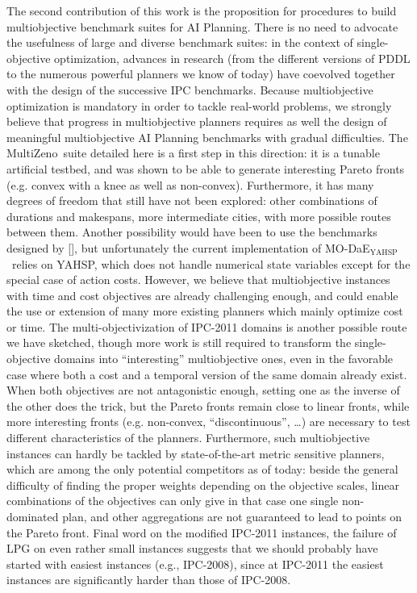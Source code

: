 \documentclass[letterpaper]{article}
\newcommand{\MODAEYAHSP}{{\sc MO-DaE$_{\text{YAHSP}}$}}
\def\MULTIZENO{{\sc MultiZeno}}
\begin{document}
The second contribution of this work is the proposition for procedures to build multiobjective benchmark suites for AI Planning. There is no need to advocate the usefulness of large and diverse benchmark suites: in the context of single-objective optimization, advances in research (from the different versions of PDDL to the numerous powerful planners we know of today) have coevolved together with the design of the successive IPC benchmarks. Because multiobjective optimization is mandatory in order to tackle real-world problems, we strongly believe that progress in multiobjective planners requires as well the design of meaningful multiobjective AI Planning benchmarks with gradual difficulties. The \MULTIZENO\ suite detailed here is a first step in this direction: it is a tunable artificial testbed, and was shown to be able to generate interesting Pareto fronts (e.g. convex with a knee as well as non-convex). Furthermore, it has many degrees of freedom that still have not been explored: other combinations of 
durations and makespans, more intermediate cities, with more possible routes between them. 
Another possibility would have been to use the benchmarks designed by \citeauthor{LPG-PlanSIG2012} [\citeyear{LPG-STAIRS2012,LPG-PlanSIG2012}], but unfortunately the current implementation of \MODAEYAHSP\ relies on YAHSP, which does not handle numerical state variables except for the special case of action costs. However, we believe that multiobjective instances with time and cost objectives are already challenging enough, and could enable the use or extension of many more existing planners which mainly optimize cost or time.
The multi-objectivization of IPC-2011 domains is another possible route we have sketched, though more work is still required to transform the single-objective domains into ``interesting'' multiobjective ones, even in the favorable case where both a cost and a temporal version of the same domain already exist. When both objectives are not antagonistic enough, setting one as the inverse of the other does the trick, but the Pareto fronts remain close to linear fronts, while more interesting fronts (e.g. non-convex, ``discontinuous'', \ldots) are necessary to test different characteristics of the planners. 
Furthermore, such multiobjective instances can hardly be tackled by state-of-the-art metric sensitive planners, which are among the only potential competitors as of today: beside the general difficulty of finding the proper weights depending on the objective scales, linear combinations of the objectives can only give in that case one single non-dominated plan, and other aggregations are not guaranteed to lead to points on the Pareto front.
Final word on the modified IPC-2011 instances, the failure of LPG on even rather small instances suggests that we should probably have started with easiest instances (e.g., IPC-2008), since at IPC-2011 the easiest instances are significantly harder than those of IPC-2008.
\end{document}
